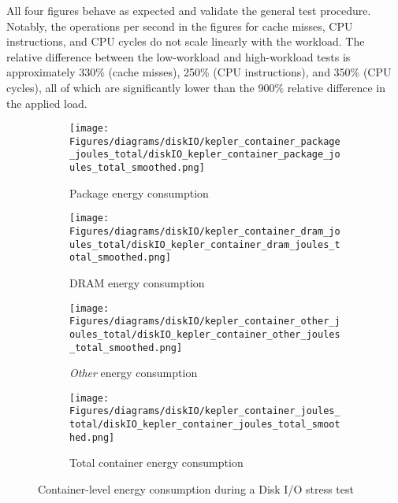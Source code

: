 All four figures behave as expected and validate the general test procedure.
Notably, the operations per second in the figures for cache misses, CPU instructions, and CPU cycles do not scale linearly with the workload. The relative difference between the low-workload and high-workload tests is approximately 330\% (cache misses), 250\% (CPU instructions), and 350\% (CPU cycles), all of which are significantly lower than the 900\% relative difference in the applied load.

\begin{figure}[H]
    \centering
    \begin{subfigure}{0.49\textwidth}
        \texttt{[image: Figures/diagrams/diskIO/kepler\_container\_package\_joules\_total/diskIO\_kepler\_container\_package\_joules\_total\_smoothed.png]}
        \caption{Package energy consumption}
        \label{fig:diskIO_kepler_container_package_joules_total}
    \end{subfigure}
    \begin{subfigure}{0.49\textwidth}
        \texttt{[image: Figures/diagrams/diskIO/kepler\_container\_dram\_joules\_total/diskIO\_kepler\_container\_dram\_joules\_total\_smoothed.png]}
        \caption{DRAM energy consumption}
        \label{fig:diskIO_kepler_container_dram_joules_total}
    \end{subfigure}
    \begin{subfigure}{0.49\textwidth}
        \texttt{[image: Figures/diagrams/diskIO/kepler\_container\_other\_joules\_total/diskIO\_kepler\_container\_other\_joules\_total\_smoothed.png]}
        \caption{\textit{Other} energy consumption}
        \label{fig:diskIO_kepler_container_other_joules_total}
    \end{subfigure}
    \begin{subfigure}{0.49\textwidth}
        \texttt{[image: Figures/diagrams/diskIO/kepler\_container\_joules\_total/diskIO\_kepler\_container\_joules\_total\_smoothed.png]}
        \caption{Total container energy consumption}
        \label{fig:diskIO_kepler_container_joules_total}
    \end{subfigure}
    \caption{Container-level energy consumption during a Disk I/O stress test}
\end{figure}

